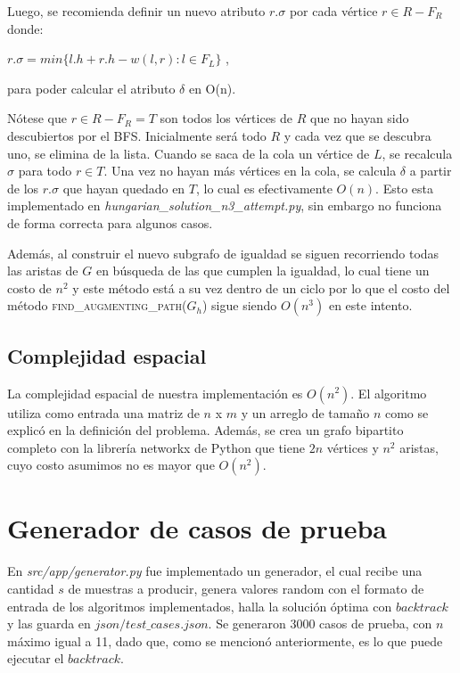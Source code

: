 \documentclass[10pt]{article} %
\begin{document}
	Luego, se recomienda definir un nuevo atributo $ r.\sigma $ por cada v\'ertice $ r \in R - F_{R} $ donde:
	
	\begin{center}
		$ r.\sigma = min\{l.h + r.h - w(l,r) : l \in F_{L}\}$ ,
	\end{center}
	
	para poder calcular el atributo $\delta$ en O(n).
	
	N\'otese que $ r \in R - F_{R} = T$ son todos los v\'ertices de $ R $ que no hayan sido descubiertos por el BFS. Inicialmente ser\'a todo $ R $ y cada vez que se descubra uno, se elimina de la lista. Cuando se saca de la cola un v\'ertice de $ L $, se recalcula $\sigma$ para todo $ r \in T$. Una vez no hayan m\'as v\'ertices en la cola, se calcula $ \delta $ a partir de los $ r.\sigma $ que hayan quedado en $ T $, lo cual es efectivamente $ O(n) $. Esto esta implementado en \textit{hungarian\_solution\_n3\_attempt.py}, sin embargo no funciona de forma correcta para algunos casos. 
	
	Adem\'as, al construir el nuevo subgrafo de igualdad se siguen recorriendo todas las aristas de $ G $ en b\'usqueda de las que cumplen la igualdad, lo cual tiene un costo de $ n^2 $ y este m\'etodo est\'a a su vez dentro de un ciclo por lo que el costo del m\'etodo \textsc{find\_augmenting\_path($G_h$)} sigue siendo $ O(n^3) $ en este intento. 

	\subsection{Complejidad espacial}
	
	La complejidad espacial de nuestra implementaci\'on es $O(n^2)$. El algoritmo utiliza como entrada una matriz de $n$ x $m$ y un arreglo de tama\~no $n$ como se explic\'o en la definici\'on del problema. Adem\'as, se crea un grafo bipartito completo con la librer\'ia networkx de Python que tiene $2n$ v\'ertices y $n^2$ aristas, cuyo costo asumimos no es mayor que $O(n^2)$.
	
	\section{Generador de casos de prueba}
	
	En \textit{src/app/generator.py} fue implementado un generador, el cual recibe una cantidad $ s $ de muestras a producir, genera valores random con el formato de entrada de los algoritmos implementados, halla la soluci\'on \'optima con $ backtrack $ y las guarda en $ json/test\_cases.json $. Se generaron 3000 casos de prueba, con $ n $ m\'aximo igual a 11, dado que, como se mencion\'o anteriormente, es lo que puede ejecutar el $ backtrack $.
	
\end{document}
